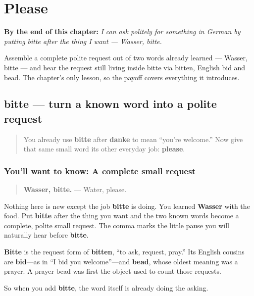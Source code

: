 
\chapter{Please}
\label{ch:ge-please}

\begin{chapteropening}
\textbf{By the end of this chapter:} \emph{I can ask politely for something in German by putting bitte after the thing I want — Wasser, bitte.}

Assemble a complete polite request out of two words already learned — Wasser, bitte — and hear the request still living inside bitte via bitten, English bid and bead. The chapter's only lesson, so the payoff covers everything it introduces.
\end{chapteropening}

\section[bitte]{bitte — turn a known word into a polite request}

\label{lesson:GE-C19-bitte-requests}



\begin{quote}
You already use \textbf{bitte} after \textbf{danke} to mean “you’re welcome.” Now give that same small word its other everyday job: \textbf{please}.
\end{quote}

\subsection*{You'll want to know: A complete small request}
\begin{quote}
\textbf{Wasser, bitte.} — Water, please.
\end{quote}

Nothing here is new except the job \textbf{bitte} is doing. You learned \textbf{Wasser} with the food. Put \textbf{bitte} after the thing you want and the two known words become a complete, polite small request. The comma marks the little pause you will naturally hear before \textbf{bitte}.

\begin{cousinweb}
\textbf{Bitte} is the request form of \textbf{bitten}, “to ask, request, pray.” Its English cousins are \textbf{bid}—as in “I bid you welcome”—and \textbf{bead}, whose oldest meaning was a prayer. A prayer bead was first the object used to count those requests.

So when you add \textbf{bitte}, the word itself is already doing the asking.
\end{cousinweb}


